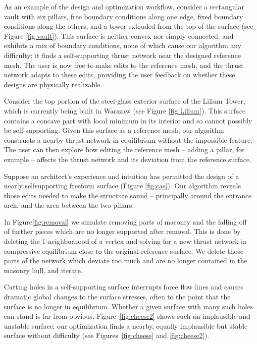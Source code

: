 \documentclass[review]{acmsiggraph}
\begin{document}
As an example of the design and 
optimization workflow, consider a rectangular vault with six pillars, free 
boundary conditions along one edge, fixed boundary conditions along the 
others, and a tower extruded from the top of the surface (see Figure 
\ref{fig:vault}). This surface is neither convex nor simply connected, and 
exhibits a mix of boundary conditions, none of which cause our algorithm 
any difficulty; it finds a self-supporting thrust network near the 
designed reference mesh. The user is now free to make edits to the 
reference mesh, and the thrust network adapts to these edits, providing 
the user feedback on whether these designs are physically realizable.


Consider the top portion of the steel-glass exterior surface of the Lilium 
Tower, which is currently being built in Warszaw (see Figure 
\ref{fig:Lilium}). This surface contains a concave part with local minimum 
in its interior and so cannot possibly be self-supporting. Given this 
surface as a reference mesh, our algorithm constructs a nearby thrust 
network in equilibrium without the impossible feature. The user can then 
explore how editing the reference mesh -- adding a pillar, for example -- 
affects the thrust network and its deviation from the reference surface.

Suppose an architect's experience and intuition has permitted the design 
of a nearly self\dash supporting freeform surface (Figure \ref{fig:cas}).
Our algorithm reveals those edits needed to make the 
structure sound -- principally around the entrance arch, and the area 
between the two pillars.

In Figure\ref{fig:removal} we simulate removing parts of masonry and 
the falling off of further pieces which are no longer supported after 
removal.
This is done by deleting the 1-neighborhood of a vertex 
and solving for a new thrust network in compressive equilibrium 
close to the original reference surface. We delete those parts of the 
network which deviate too much and are no longer contained in the masonry 
hull, and iterate. 




Cutting holes in a self-supporting surface interrupts force flow lines and 
causes dramatic global changes to the surface stresses, often to the point 
that the surface is no longer in equilibrium. Whether a given surface with 
many such holes can stand is far from obvious. Figure~\ref{fig:cheese2} 
shows such an implausible and unstable surface; our optimization finds a 
nearby, equally implausible but stable surface without difficulty (see 
Figures~\ref{fig:cheese} and \ref{fig:cheese2}).
\end{document}
